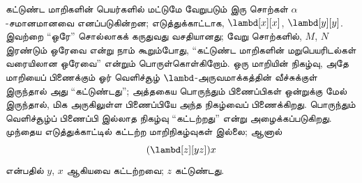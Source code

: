 \documentclass[../../../include/open-logic-section]{subfiles}
\begin{document}
கட்டுண்ட மாறிகளின் பெயர்களில் மட்டுமே வேறுபடும் இரு சொற்கள்
$\alpha$-சமானமானவை எனப்படுகின்றன; எடுத்துக்காட்டாக,
$\lambd[x][x]$, $\lambd[y][y]$. இவற்றை ``ஒரே'' சொல்லாகக் கருதுவது வசதியானது;
வேறு சொற்களில், $M$, $N$ இரண்டும் ஒரேவை என்று நாம் கூறும்போது, ``கட்டுண்ட
மாறிகளின் மறுபெயரிடல்கள் வரையிலான ஒரேவை'' என்றும் பொருள்கொள்கிறோம்.
ஒரு மாறியின் நிகழ்வு, அதே மாறியைப் பிணைக்கும் ஓர் வெளிச்சூழ்
$\lambd$-அருவமாக்கத்தின் வீச்சுக்குள் இருந்தால் அது ``கட்டுண்டது''; அத்தகைய
பொருந்தும் பிணைப்பிகள் ஒன்றுக்கு மேல் இருந்தால், மிக அருகிலுள்ள பிணைப்பியே அந்த
நிகழ்வைப் பிணைக்கிறது. பொருந்தும் வெளிச்சூழ்ப் பிணைப்பி இல்லாத நிகழ்வு
``கட்டற்றது'' என்று அழைக்கப்படுகிறது. முந்தைய எடுத்துக்காட்டில் கட்டற்ற
மாறிநிகழ்வுகள் இல்லை; ஆனால்
\[
(\lambd[z][yz])x
\]
என்பதில் $y$, $x$ ஆகியவை கட்டற்றவை; $z$ கட்டுண்டது.
\end{document}
